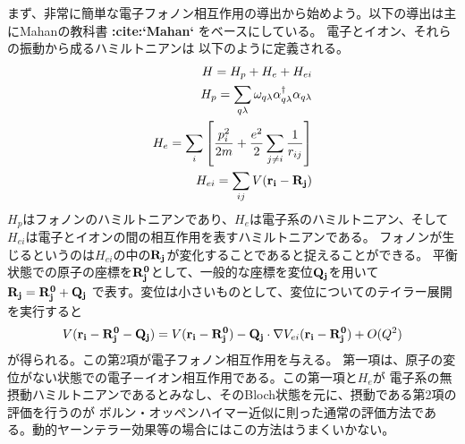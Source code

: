 \documentclass[letterpaper,10pt,dvipdfmx]{sphinxhowto}
\begin{document}
まず、非常に簡単な電子フォノン相互作用の導出から始めよう。以下の導出は主にMahanの教科書
{\color{red}\bfseries{}:cite:{}`Mahan{}`}  をベースにしている。
電子とイオン、それらの振動から成るハミルトニアンは
以下のように定義される。
\begin{equation*}
\begin{split}\begin{aligned}
H=H_p+H_e+H_{ei} \\
H_p=\sum_{q\lambda} \omega_{q\lambda} \alpha_{q\lambda}^\dagger
\alpha_{q\lambda} \\
H_e =\sum_{i} \left [ \frac{p_i^2}{2m} + \frac{e^2}{2} \sum_{j\neq i}
\frac{1}{r_{ij}} \right] \\
H_{ei} = \sum_{ij} V(\bf{r_i} -  \bf{R_j})\end{aligned}\end{split}
\end{equation*}
\(H_p\)はフォノンのハミルトニアンであり、\(H_e\)は電子系のハミルトニアン、そして\(H_{ei}\)は電子とイオンの間の相互作用を表すハミルトニアンである。
フォノンが生じるというのは\(H_{ei}\)の中の\(\bf{R_j}\)が変化することであると捉えることができる。
平衡状態での原子の座標を\(\bf{R_j^{0}}\)として、一般的な座標を変位\(\bf{Q_j}\)を用いて\(\bf{R_j}=\bf{R_j^{0}}+\bf{Q_j}\)
で表す。変位は小さいものとして、変位についてのテイラー展開を実行すると
\begin{equation*}
\begin{split}\begin{aligned}
V({\bf r_i} - {\bf R_j^{0}}-{\bf Q_j})=V({\bf r_i} - {\bf
R_j^{0}})-{\bf Q_j}\cdot \nabla V_{ei}({\bf r_i} - {\bf R_j^{0}}) +O(Q^2)\end{aligned}\end{split}
\end{equation*}
が得られる。この第2項が電子フォノン相互作用を与える。
第一項は、原子の変位がない状態での電子－イオン相互作用である。この第一項と\(H_e\)が
電子系の無摂動ハミルトニアンであるとみなし、そのBloch状態を元に、摂動である第2項の評価を行うのが
ボルン・オッペンハイマー近似に則った通常の評価方法である。動的ヤーンテラー効果等の場合にはこの方法はうまくいかない。
\end{document}
